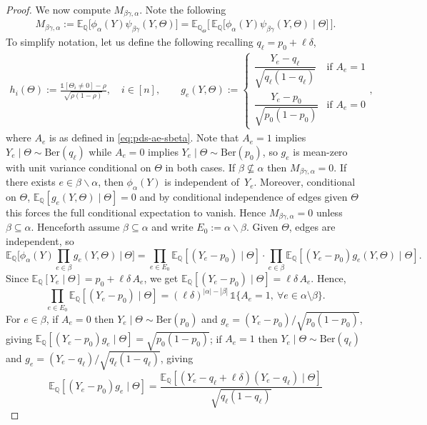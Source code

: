 \documentclass[11pt, letterpaper]{article}
\numberwithin{equation}{section}
\newcommand{\E}{\mathbb{E}}
\newcommand{\QQ}{\mathbb{Q}}
\begin{document}
\begin{proof}
\noindent We now compute $M_{\beta\gamma,\alpha}$.
Note the following \begin{align*}
    M_{\beta\gamma,\alpha}
:= \E_{\mathbb Q}\big[\phi_\alpha(Y)\psi_{\beta\gamma}(Y,\Theta)\big]
= \E_{\QQ_\Theta}\Big[\,\E_\QQ\big[\phi_\alpha(Y)\psi_{\beta\gamma}(Y,\Theta)\mid\Theta\big]\,\Big].
\end{align*}
%
To simplify notation, let us define the following recalling $q_\ell=p_0+\ell\delta$, 
\begin{align*}
    h_i(\Theta) := \frac{\mathds 1[\Theta_i\neq 0]-\rho}{\sqrt{\rho(1-\rho)}}, \quad i \in [n], \qquad
    g_e(Y,\Theta):=
\begin{cases}
\dfrac{Y_e-q_\ell}{\sqrt{q_\ell(1-q_\ell)}} & \text{if }A_e=1\\[0.8em]
\dfrac{Y_e-p_0}{\sqrt{p_0(1-p_0)}} & \text{if }A_e=0
\end{cases},
\end{align*}
where $A_e$ is as defined in \eqref{eq:pds-ae-sbeta}. Note that $A_e=1$ implies $Y_e\mid\Theta\sim\mathrm{Ber}(q_\ell)$
while $A_e=0$ implies $Y_e\mid\Theta\sim\mathrm{Ber}(p_0)$,
so $g_e$ is mean-zero with unit variance conditional on $\Theta$ in both cases.
If $\beta\not\subseteq\alpha$ then $M_{\beta\gamma,\alpha}=0$.
If there exists $e\in\beta\backslash\alpha$, then $\phi_\alpha(Y)$ is independent of~$Y_e$.
Moreover, conditional on $\Theta$,
$
\E_{\QQ}[g_e(Y,\Theta)\mid\Theta]=0
$
and by conditional independence
of edges given $\Theta$ this forces the full conditional expectation to vanish. Hence
$M_{\beta\gamma,\alpha}=0$ unless $\beta\subseteq\alpha$. Henceforth assume $\beta\subseteq\alpha$ and write $E_0:=\alpha\backslash\beta$.
\medskip
\noindent Given $\Theta$, edges are independent, so
\[
\E_{\QQ}\Big[\phi_\alpha(Y)\prod_{e\in\beta}g_e(Y,\Theta)\ \Big|\ \Theta\Big]
=
\prod_{e\in E_0}\E_{\QQ}[(Y_e-p_0)\mid\Theta]\cdot
\prod_{e\in \beta}\E_{\QQ}[(Y_e-p_0)g_e(Y,\Theta)\mid\Theta].
\]
Since $\E_{\QQ}[Y_e\mid\Theta]=p_0+\ell\delta\, A_e$, we get $\E_{\QQ}[(Y_e-p_0)\mid\Theta]=\ell\delta\, A_e$. Hence,
\[
\prod_{e\in E_0}\E_{\QQ}[(Y_e-p_0)\mid\Theta]
=(\ell\delta)^{|\alpha|-|\beta|}\,\mathds 1\{A_e=1,\ \forall e\in\alpha\setminus\beta\}.
\]
For $e\in\beta$, if $A_e=0$ then $Y_e\mid\Theta\sim\mathrm{Ber}(p_0)$ and
$g_e=(Y_e-p_0)/\sqrt{p_0(1-p_0)}$, giving
$\E_{\QQ}[(Y_e-p_0)g_e\mid\Theta]=\sqrt{p_0(1-p_0)}$; if $A_e=1$ then
$Y_e\mid\Theta\sim\mathrm{Ber}(q_\ell)$ and $g_e=(Y_e-q_\ell)/\sqrt{q_\ell(1-q_\ell)}$, giving
\[
\E_\QQ[(Y_e-p_0)g_e\mid\Theta]
= \frac{\E_\QQ[(Y_e - q_\ell + \ell\delta)(Y_e - q_\ell)\mid\Theta]}{\sqrt{q_\ell(1-q_\ell)}}
\]
\end{proof}
\end{document}
